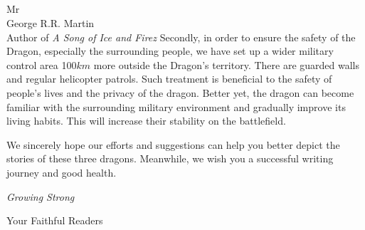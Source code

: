 \documentclass[12pt, letterpaper]{letter} %
\begin{document}
\begin{letter}{
    \quad\\
    \quad\\
    \quad\\
    \quad\\
	Mr\\
	George R.R. Martin \\
    Author of \textit{A Song of Ice and Firez}
}
Secondly, in order to ensure the safety of the Dragon, especially the surrounding people, we have set up a wider military control area 100$km$ more outside the Dragon's territory. There are guarded walls and regular helicopter patrols. Such treatment is beneficial to the safety of people's lives and the privacy of the dragon. Better yet, the dragon can become familiar with the surrounding military environment and gradually improve its living habits. This will increase their stability on the battlefield.

We sincerely hope our efforts and suggestions can help you better depict the stories of these three dragons. Meanwhile, we wish you a successful writing journey and good health.


\begin{flushright}
\textit{Growing Strong}

 Your Faithful Readers
\end{flushright}





\end{letter}
\end{document}
